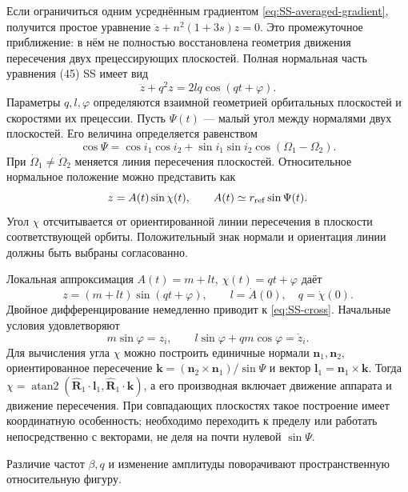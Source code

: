 \documentclass[a4paper,11pt]{article}
\numberwithin{equation}{section}
\theoremstyle{remark}
\newcommand{\vect}[1]{\boldsymbol{#1}}
\DeclareMathOperator{\atanTwo}{atan2}
\begin{document}
Если ограничиться одним усреднённым градиентом
\eqref{eq:SS-averaged-gradient}, получится простое уравнение
$\ddot z+n^2(1+3s)z=0$. Это промежуточное приближение:
в нём не полностью восстановлена геометрия движения
пересечения двух прецессирующих плоскостей.
Полная нормальная часть уравнения (45) SS имеет вид
\begin{equation}
 \ddot z+q^2z=2lq\cos(qt+\varphi).
 \label{eq:SS-cross}
\end{equation}
Параметры $q,l,\varphi$ определяются взаимной геометрией
орбитальных плоскостей и скоростями их прецессии.
Пусть $\Psi(t)$ --- малый угол между нормалями двух
плоскостей. Его величина определяется равенством
\begin{equation}
 \cos\Psi=\cos i_1\cos i_2+
                    \sin i_1\sin i_2\cos(\Omega_1-\Omega_2).
 \label{eq:mutual-plane-angle}
\end{equation}
При $\dot\Omega_1\ne\dot\Omega_2$ меняется линия пересечения плоскостей.
Относительное нормальное положение можно представить
как
\begin{equation}
 z=A(t)\sin\chi(t),\qquad
 A(t)\simeq r_{\rm ref}\sin\Psi(t).
 \label{eq:SS-amplitude-geometry}
\end{equation}
Угол $\chi$ отсчитывается от ориентированной линии
пересечения в плоскости соответствующей орбиты.
Положительный знак нормали и ориентация линии должны
быть выбраны согласованно.

Локальная аппроксимация
$A(t)=m+lt$, $\chi(t)=qt+\varphi$ даёт
\begin{equation}
 z=(m+lt)\sin(qt+\varphi),\qquad
 l=\dot A(0),\quad q=\dot\chi(0).
 \label{eq:SS-cross-solution}
\end{equation}
Двойное дифференцирование немедленно приводит
к \eqref{eq:SS-cross}. Начальные условия удовлетворяют
\[
 m\sin\varphi=z_i,\qquad
 l\sin\varphi+qm\cos\varphi=\dot z_i.
\]
Для вычисления угла $\chi$ можно построить единичные
нормали $\vect n_1,\vect n_2$, ориентированное пересечение
$\vect k=(\vect n_2\times\vect n_1)/\sin\Psi$
и вектор $\vect l_1=\vect n_1\times\vect k$.
Тогда $\chi=\atanTwo(\widehat{\vect R}_1\cdot\vect l_1,
\widehat{\vect R}_1\cdot\vect k)$, а его производная
включает движение аппарата и движение пересечения.
При совпадающих плоскостях такое построение имеет
координатную особенность; необходимо переходить к пределу
или работать непосредственно с векторами, не деля
на почти нулевой $\sin\Psi$.

Различие частот $\beta,q$ и изменение амплитуды
поворачивают пространственную относительную фигуру.
\end{document}
